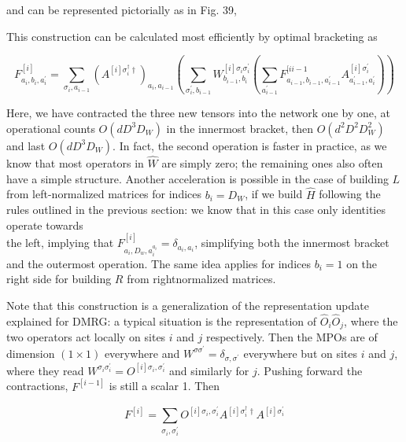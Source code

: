 \documentclass[12pt]{article}
\begin{document}
and can be represented pictorially as in Fig. 39,

This construction can be calculated most efficiently by optimal bracketing as


\begin{equation*}
F_{a_{i}, b_{i}, a_{i}^{\prime}}^{[i]}=\sum_{\sigma_{i}, a_{i-1}}\left(A^{[i] \sigma_{i}^{\dagger} \dagger}\right)_{a_{i}, a_{i-1}}\left(\sum_{\sigma_{i}^{\prime}, b_{i-1}} W_{b_{i-1}, b_{i}}^{[i] \sigma_{i} \sigma_{i}^{\prime}}\left(\sum_{a_{i-1}^{\prime}} F_{a_{i-1}, b_{i-1}, a_{i-1}^{\prime}}^{[i i-1} A_{a_{i-1}^{\prime}, a_{i}^{\prime}}^{[i] \sigma_{i}^{\prime}}\right)\right) \tag{197}
\end{equation*}


Here, we have contracted the three new tensors into the network one by one, at operational counts $O\left(d D^{3} D_{W}\right)$ in the innermost bracket, then $O\left(d^{2} D^{2} D_{W}^{2}\right)$ and last $O\left(d D^{3} D_{W}\right)$. In fact, the second operation is faster in practice, as we know that most operators in $\hat{W}$ are simply zero; the remaining ones also often have a simple structure. Another acceleration is possible in the case of building $L$ from left-normalized matrices for indices $b_{i}=D_{W}$, if we build $\hat{H}$ following the rules outlined in the previous section: we know that in this case only identities operate towards\\
the left, implying that $F_{a_{i}, D_{w}, a_{i}^{a_{i}}}^{[i]}=\delta_{a_{i}, a_{i}}$, simplifying both the innermost bracket and the outermost operation. The same idea applies for indices $b_{i}=1$ on the right side for building $R$ from rightnormalized matrices.

Note that this construction is a generalization of the representation update explained for DMRG: a typical situation is the representation of $\hat{O}_{i} \hat{O}_{j}$, where the two operators act locally on sites $i$ and $j$ respectively. Then the MPOs are of dimension $(1 \times 1)$ everywhere and $W^{\sigma \sigma^{\prime}}=\delta_{\sigma, \sigma^{\prime}}$ everywhere but on sites $i$ and $j$, where they read $W^{\sigma_{i} \sigma_{i}^{\prime}}=O^{[i] \sigma_{i}, \sigma_{i}^{\prime}}$ and similarly for $j$. Pushing forward the contractions, $F^{[i-1]}$ is still a scalar 1. Then


\begin{equation*}
F^{[i]}=\sum_{\sigma_{i}, \sigma_{i}^{\prime}} O^{[i] \sigma_{i}, \sigma_{i}^{\prime}} A^{[i] \sigma_{i}^{\dagger} \dagger} A^{[i] \sigma_{i}^{\prime}} \tag{198}
\end{equation*}
\end{document}
